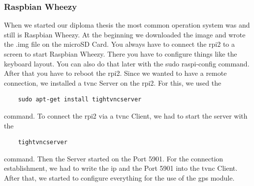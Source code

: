 \subsubsection{Raspbian Wheezy}
When we started our diploma thesis the most common operation system was and still is Raspbian Wheezy. At the beginning we downloaded the image and wrote the .img file on the microSD Card. You always have to connect the \gls{rpi2} to a screen to start Raspbian Wheezy. There you have to configure things like the keyboard layout. You can also do that later with the sudo raspi-config command. After that you have to reboot the \gls{rpi2}.
Since we wanted to have a remote connection, we installed a \gls{tvnc} Server on the \gls{rpi2}. For this, we used the  
\begin{verbatim}
	sudo apt-get install tightvncserver
\end{verbatim}
command.\newline
To connect the \gls{rpi2} via a \gls{tvnc} Client, we had to start the server with the 
\begin{verbatim}
	tightvncserver
\end{verbatim}
command. Then the Server started on the Port 5901. For the connection establishment, we had to write the \gls{ip} and the Port 5901 into the \gls{tvnc} Client. After that, we started to configure everything for the use of the \gls{gps} module.
